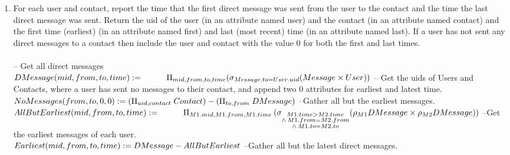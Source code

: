 \documentclass{article}
\begin{document}
\begin{enumerate}
{}
\item   %
For each user and contact, report the time that the first direct message was sent from the user to the contact and the time the last direct message was sent. Return the uid of the user (in an attribute named user) and the contact (in an attribute named contact) and the first time (earliest) (in an attribute named first) and last (most recent) time (in an attribute named last). If a user has not
sent any direct messages to a contact then include the user and contact with the value 0 for both the first and last times. \\\\ [5pt]
\large{
\hspace*{1cm} -- Get all direct messages \\ [5pt]
$
DMessage(mid, from, to, time) := \\ [5pt] 
\hspace*{1cm} \Pi_{mid, from, to, time} (\sigma_{Message.to = User.uid} (Message \times User)) \\\\ [5pt]
$
\hspace*{1cm} -- Get the uids of Users and Contacts, where a user has sent no messages to their contact, and append two 0 attributes for earliest and latest time.  \\[5pt]
$
NoMessages(from, to, 0, 0) := (\Pi_{uid, contact} \; Contact)  -  (\Pi_{to, from} \; DMessage) \\\\[5pt]
$
\hspace*{1cm} --Gather all but the earliest messages. \\[5pt]
$
AllButEarliest(mid, from, to, time) := \\
\hspace*{1cm} \Pi_{M1.mid, M1.from, M1.time} \: (\sigma_{\substack{M1.time>M2.time  \\
					\wedge \: M1.from = M2.from \\
					\wedge \: M1.to = M2.to}} (\rho_{M1} DMessage \times \rho_{M2} DMessage)) \\\\\\
$
\hspace*{1cm} --Get the earliest messages of each user.  \\[5pt]
$
Earliest(mid, from, to, time) := DMessage - AllButEarliest \\\\[5pt]
$
\hspace*{1cm} --Gather all but the latest direct messages.  \\[5pt]
}
\end{enumerate}
\end{document}
